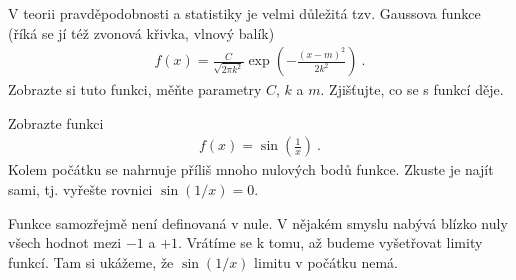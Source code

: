 \begin{exercise}
    V teorii pravděpodobnosti a statistiky je velmi důležitá tzv. Gaussova funkce (říká se jí též zvonová křivka, vlnový balík)
    \begin{align}
        f(x) = \frac{C}{\sqrt{2 \pi k^2}} \exp \left( - \frac{(x-m)^2}{2k^2}\right) \:.
    \end{align}
    Zobrazte si tuto funkci, měňte parametry $C$, $k$ a $m$. Zjišťujte, co se s funkcí děje.
\end{exercise}

\begin{exercise}
    Zobrazte funkci \begin{align}
        f(x) = \sin \left( \frac{1}{x} \right) \:.
    \end{align}
    Kolem počátku se nahrnuje příliš mnoho nulových bodů funkce. Zkuste je najít sami, tj. vyřešte rovnici $\sin(1/x) = 0$. 
    
    Funkce samozřejmě není definovaná v nule. V nějakém smyslu nabývá blízko nuly všech hodnot mezi $-1$ a $+1$. Vrátíme se k tomu, až budeme vyšetřovat limity funkcí. Tam si ukážeme, že $\sin(1/x)$ limitu v počátku nemá.
\end{exercise}